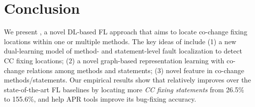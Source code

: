 \section{Conclusion}

We present {\tool}, a novel DL-based FL approach that aims to locate
co-change fixing locations within one or multiple methods. The key
ideas of {\tool} include (1) a new dual-learning model of method- and
statement-level fault localization to detect CC fixing locations; (2)
a novel graph-based representation learning with co-change relations
among methods and statements; (3) novel feature in co-change
methods/statements. Our empirical results show that
%
{\tool} relatively improves over the state-of-the-art
FL baselines by locating more {\em CC fixing statements} from 26.5\% to
155.6\%, and help APR tools improve its bug-fixing accuracy.



